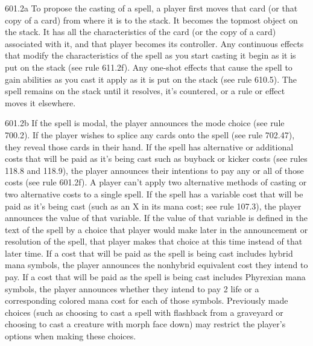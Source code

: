 601.2a To propose the casting of a spell, a player first moves that card (or that copy of a card) from where it is to the stack. It becomes the topmost object on the stack. It has all the characteristics of the card (or the copy of a card) associated with it, and that player becomes its controller. Any continuous effects that modify the characteristics of the spell as you start casting it begin as it is put on the stack (see rule 611.2f). Any one-shot effects that cause the spell to gain abilities as you cast it apply as it is put on the stack (see rule 610.5). The spell remains on the stack until it resolves, it’s countered, or a rule or effect moves it elsewhere.

601.2b If the spell is modal, the player announces the mode choice (see rule 700.2). If the player wishes to splice any cards onto the spell (see rule 702.47), they reveal those cards in their hand. If the spell has alternative or additional costs that will be paid as it’s being cast such as buyback or kicker costs (see rules 118.8 and 118.9), the player announces their intentions to pay any or all of those costs (see rule 601.2f). A player can’t apply two alternative methods of casting or two alternative costs to a single spell. If the spell has a variable cost that will be paid as it’s being cast (such as an {X} in its mana cost; see rule 107.3), the player announces the value of that variable. If the value of that variable is defined in the text of the spell by a choice that player would make later in the announcement or resolution of the spell, that player makes that choice at this time instead of that later time. If a cost that will be paid as the spell is being cast includes hybrid mana symbols, the player announces the nonhybrid equivalent cost they intend to pay. If a cost that will be paid as the spell is being cast includes Phyrexian mana symbols, the player announces whether they intend to pay 2 life or a corresponding colored mana cost for each of those symbols. Previously made choices (such as choosing to cast a spell with flashback from a graveyard or choosing to cast a creature with morph face down) may restrict the player’s options when making these choices.

